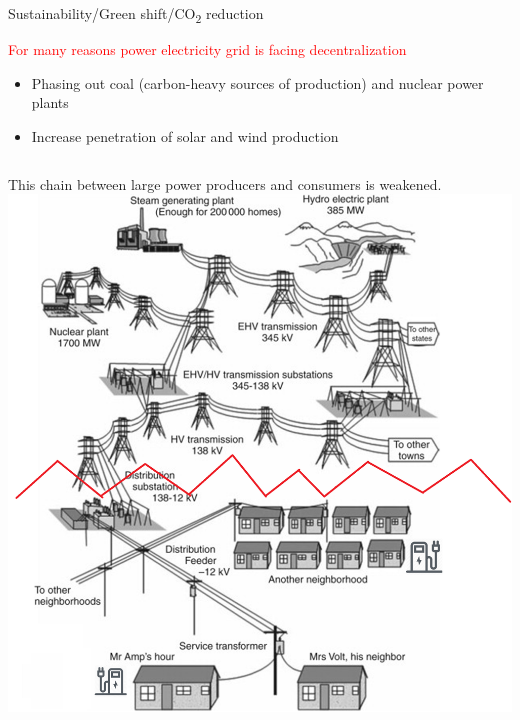 \documentclass{beamer}
\begin{document}
\begin{frame}{Sustainability/Green shift/CO\textsubscript{2} reduction}
\begin{alertblock}{\textcolor{red}{For many reasons power electricity grid is facing decentralization}}
\begin{itemize}
\item<1-> Phasing out coal (carbon-heavy sources of production) and nuclear power plants
\item<2-> Increase penetration of solar and wind production
\end{itemize}
\end{alertblock}
\begin{columns}
    This chain between large power producers and consumers is weakened.
\includegraphics[width=2 in , height=1.6 in]{Figures/EVchalendgebreak.png}
\end{columns}
\end{frame}

\end{document}
